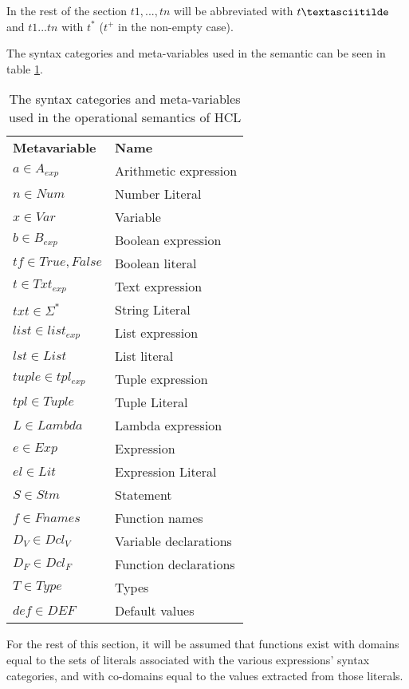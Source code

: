 In the rest of the section $t1, .
.
.
 , tn$ will be abbreviated with $t\textasciitilde$ and $t1 .
 .
 .
  tn$ with $t^*$ ($t^+$ in the non-empty case).

The syntax categories and meta-variables used in the semantic can be seen in table \ref{tab:metaVar}. 
	\begin{table}[H]
		\begin{tabular}{ll}
			\textbf{Metavariable} & \textbf{Name} \\
			$a \in A_{exp}$ 	  & Arithmetic expression \\
			$n \in Num$			  & Number Literal \\
			$x \in Var$           & Variable \\
			$b \in B_{exp}$		  & Boolean expression\\ 
			$tf \in {True,False}$ & Boolean literal \\
			$t \in Txt_{exp}$     & Text expression\\
			$txt \in {\Sigma^*}$  & String Literal \\
			$list \in list_{exp}$ & List expression \\
			$lst \in List$		  & List literal\\
			$tuple \in tpl_{exp}$ & Tuple expression\\
			$tpl \in Tuple$	      & Tuple Literal\\
			$L \in Lambda$		  & Lambda expression\\
			$e \in Exp$			  & Expression\\
			$el \in Lit$		  & Expression Literal\\
			$S \in Stm$           & Statement\\
			$f \in Fnames$ 		  & Function names\\
			$D_V \in Dcl_V$		  & Variable declarations\\
			$D_F \in Dcl_F$       & Function declarations\\
			$T \in Type$          & Types\\
			$def \in DEF$		  & Default values
		\end{tabular}
			\centering
			\caption{The syntax categories and meta-variables used in the operational semantics of HCL}
			\label{tab:metaVar}
	\end{table}
For the rest of this section, it will be assumed that functions exist with domains equal to the sets of literals associated with the various expressions' syntax categories, and with co-domains equal to the values extracted from those literals.

